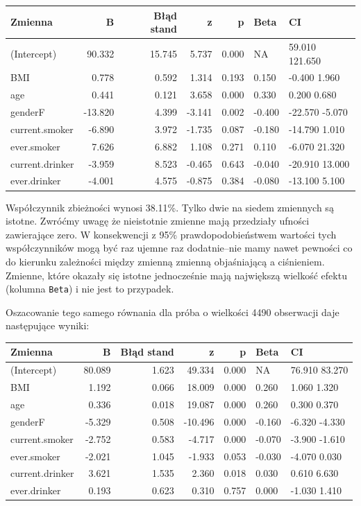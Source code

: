 \documentclass[
  openany]{book}
\begin{document}
\begin{example}
\begin{tabular}{l|r|r|r|r|l|l}
\hline
Zmienna & B & Błąd stand & z & p & Beta & CI\\
\hline
(Intercept) & 90.332 & 15.745 & 5.737 & 0.000 & NA & 59.010 121.650\\
\hline
BMI & 0.778 & 0.592 & 1.314 & 0.193 & 0.150 & -0.400 1.960\\
\hline
age & 0.441 & 0.121 & 3.658 & 0.000 & 0.330 & 0.200 0.680\\
\hline
genderF & -13.820 & 4.399 & -3.141 & 0.002 & -0.400 & -22.570 -5.070\\
\hline
current.smoker & -6.890 & 3.972 & -1.735 & 0.087 & -0.180 & -14.790 1.010\\
\hline
ever.smoker & 7.626 & 6.882 & 1.108 & 0.271 & 0.110 & -6.070 21.320\\
\hline
current.drinker & -3.959 & 8.523 & -0.465 & 0.643 & -0.040 & -20.910 13.000\\
\hline
ever.drinker & -4.001 & 4.575 & -0.875 & 0.384 & -0.080 & -13.100 5.100\\
\hline
\end{tabular}

Współczynnik zbieżności wynosi 38.11\%. Tylko dwie na siedem zmiennych
są istotne. Zwróćmy uwagę że nieistotnie zmienne mają przedziały ufności zawierające zero. W konsekwencji
z 95\% prawdopodobieństwem wartości tych współczynników mogą być raz ujemne raz dodatnie--nie mamy
nawet pewności co do kierunku zależności między zmienną zmienną objaśniającą a ciśnieniem.
Zmienne, które okazały się istotne jednocześnie mają największą wielkość efektu (kolumna \texttt{Beta})
i nie jest to przypadek.

Oszacowanie tego samego równania dla próba o wielkości 4490 obserwacji daje następujące
wyniki:

\begin{tabular}{l|r|r|r|r|l|l}
\hline
Zmienna & B & Błąd stand & z & p & Beta & CI\\
\hline
(Intercept) & 80.089 & 1.623 & 49.334 & 0.000 & NA & 76.910 83.270\\
\hline
BMI & 1.192 & 0.066 & 18.009 & 0.000 & 0.260 & 1.060 1.320\\
\hline
age & 0.336 & 0.018 & 19.087 & 0.000 & 0.260 & 0.300 0.370\\
\hline
genderF & -5.329 & 0.508 & -10.496 & 0.000 & -0.160 & -6.320 -4.330\\
\hline
current.smoker & -2.752 & 0.583 & -4.717 & 0.000 & -0.070 & -3.900 -1.610\\
\hline
ever.smoker & -2.021 & 1.045 & -1.933 & 0.053 & -0.030 & -4.070 0.030\\
\hline
current.drinker & 3.621 & 1.535 & 2.360 & 0.018 & 0.030 & 0.610 6.630\\
\hline
ever.drinker & 0.193 & 0.623 & 0.310 & 0.757 & 0.000 & -1.030 1.410\\
\hline
\end{tabular}


\end{example}
\end{document}
